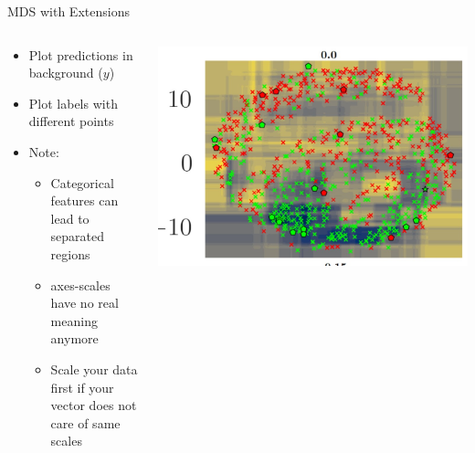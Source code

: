 \documentclass[aspectratio=169]{../latex_main/tntbeamer}  %
\begin{document}
	\begin{frame}[c]{MDS with Extensions}
        
        \begin{columns}
        
        \begin{column}{0.5\textwidth}
        
        \begin{itemize}
            \item Plot predictions in background ($y$)
            \item Plot labels with different points
            \smallskip
            \item Note: 
            \begin{itemize}
                \item Categorical features can lead to separated regions
                \item axes-scales have no real meaning anymore
                \item Scale your data first if your vector does not care of same scales 
            \end{itemize}
        \end{itemize}
        
        \end{column}
        
        \begin{column}{0.5\textwidth}
        
        \begin{center}
            \includegraphics[width=1\textwidth]{mds1.jpg}
        \end{center}
        
        \end{column}
        
        \end{columns}
        
	\end{frame}
	
\end{document}
